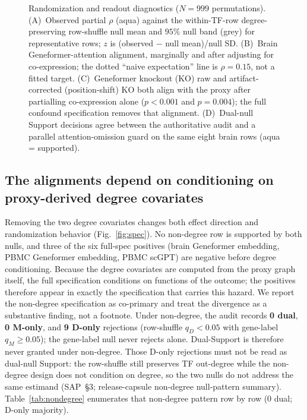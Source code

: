 \documentclass[fleqn,10pt,lineno]{wlpeerj}
\newcommand{\fitfig}[1]{\resizebox{\ifdim\width>\linewidth\linewidth\else\width\fi}{!}{#1}}
\begin{document}
\begin{figure}[!tbp]\centering
\fitfig{}
\caption{Randomization and readout diagnostics ($N=999$ permutations). (A)~Observed partial
$\rho$ (aqua) against the within-TF-row degree-preserving row-shuffle null mean and $95\%$ null
band (grey) for representative rows; $z$ is (observed $-$ null mean)/null SD. (B)~Brain
Geneformer-attention alignment, marginally and after adjusting for co-expression; the dotted
``naive expectation'' line is $\rho=0.15$, not a fitted target. (C)~Geneformer knockout (KO) raw
and artifact-corrected (position-shift) KO both align with the proxy after partialling
co-expression alone ($p<0.001$ and $p=0.004$); the full confound specification removes that
alignment. (D)~Dual-null Support decisions agree between the authoritative audit and a parallel
attention-omission guard on the same eight brain rows (aqua = supported).}\label{fig:nulls}
\end{figure}

\subsection{The alignments depend on conditioning on proxy-derived degree covariates}
Removing the two degree covariates changes both effect direction and randomization behavior
(Fig.~\ref{fig:spec}). No non-degree row is supported by both nulls, and three of the six
full-spec positives (brain Geneformer embedding, PBMC Geneformer embedding, PBMC scGPT) are
negative before degree conditioning. Because the degree covariates are computed from the proxy
graph itself, the full specification conditions on functions of the outcome; the positives
therefore appear in exactly the specification that carries this hazard. We report the non-degree
specification as co-primary and treat the divergence as a substantive finding, not a footnote.
Under non-degree, the audit records \textbf{0 dual}, \textbf{0 M-only}, and \textbf{9 D-only}
rejections (row-shuffle $q_D<0.05$ with gene-label $q_M\ge0.05$); the gene-label null never
rejects alone. Dual-Support is therefore never granted under non-degree. Those D-only rejections
must not be read as dual-null Support: the row-shuffle still preserves TF out-degree while the
non-degree design does not condition on degree, so the two nulls do not address the same estimand
(SAP~\S3; release-capsule non-degree null-pattern summary).
Table~\ref{tab:nondegree} enumerates that non-degree pattern row by row (0 dual; D-only majority).
\end{document}
